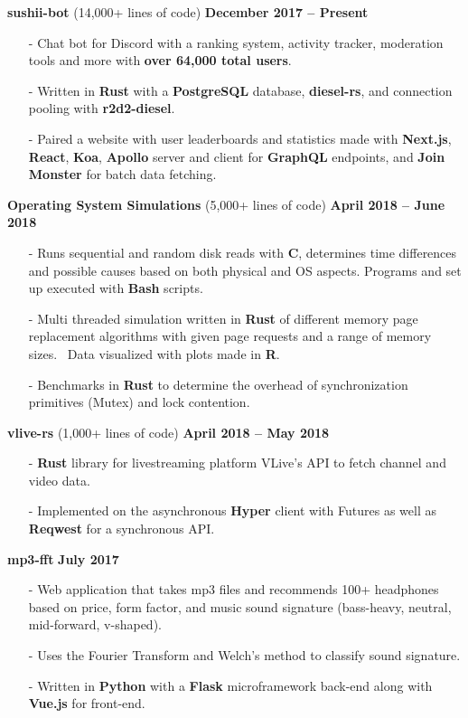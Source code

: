 \documentclass[margin,line]{res}
\begin{document}
\begin{resume}
{\bf sushii-bot} (14,000+ lines of code) \hfill {\bf December 2017 -- Present} \\
  \vspace{-3.5mm}
  \begin{itemize} \itemsep -2pt
    \item[-] Chat bot for Discord with a ranking system, activity tracker, moderation tools and more with {\bf over 64,000 total users}.
    \item[-] Written in {\bf Rust} with a {\bf PostgreSQL} database, {\bf diesel-rs}, and connection pooling with {\bf r2d2-diesel}.
    \item[-] Paired a website with user leaderboards and statistics made with {\bf Next.js}, {\bf React}, {\bf Koa}, {\bf Apollo} server and client for {\bf GraphQL} endpoints,
      and {\bf Join Monster} for batch data fetching.
  \end{itemize}
{\bf Operating System Simulations} (5,000+ lines of code) \hfill {\bf April 2018 -- June 2018} \\
  \vspace{-3.5mm}
  \begin{itemize} \itemsep -2pt
    \item[-] Runs sequential and random disk reads with {\bf C}, determines time differences and possible causes based on both physical and OS aspects. 
      Programs and set up executed with {\bf Bash} scripts.
    \item[-] Multi threaded simulation written in {\bf Rust} of different memory page replacement algorithms with given page requests and a range of memory sizes. \
    Data visualized with plots made in {\bf R}.
    \item[-] Benchmarks in {\bf Rust} to determine the overhead of synchronization primitives (Mutex) and lock contention.
  \end{itemize}
{\bf vlive-rs} (1,000+ lines of code) \hfill {\bf April 2018 -- May 2018} \\
  \vspace{-3.5mm}
  \begin{itemize} \itemsep -2pt
    \item[-] {\bf Rust} library for livestreaming platform VLive's API to fetch channel and video data.
    \item[-] Implemented on the asynchronous {\bf Hyper} client with Futures as well as {\bf Reqwest} for a synchronous API.
  \end{itemize}
{\bf mp3-fft} \hfill {\bf July 2017} \\
  \vspace{-3.5mm}
  \begin{itemize} \itemsep -2pt
    \item[-] Web application that takes mp3 files and recommends 100+ headphones based on price, form factor, and
      music sound signature (bass-heavy, neutral, mid-forward, v-shaped).
    \item[-] Uses the Fourier Transform and Welch's method to classify sound signature.
    \item[-] Written in {\bf Python} with a {\bf Flask} microframework back-end along with {\bf Vue.js} for front-end.
  \end{itemize}

\end{resume}
\end{document}
